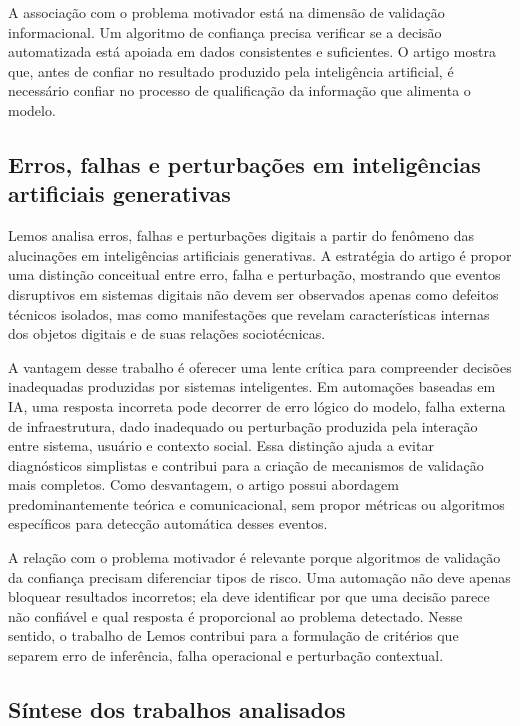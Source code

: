 \documentclass[12pt]{article}
\begin{document}
A associação com o problema motivador está na dimensão de validação informacional. Um algoritmo de confiança precisa verificar se a decisão automatizada está apoiada em dados consistentes e suficientes. O artigo mostra que, antes de confiar no resultado produzido pela inteligência artificial, é necessário confiar no processo de qualificação da informação que alimenta o modelo.

\subsection{Erros, falhas e perturbações em inteligências artificiais generativas}

Lemos \cite{lemos2024} analisa erros, falhas e perturbações digitais a partir do fenômeno das alucinações em inteligências artificiais generativas. A estratégia do artigo é propor uma distinção conceitual entre erro, falha e perturbação, mostrando que eventos disruptivos em sistemas digitais não devem ser observados apenas como defeitos técnicos isolados, mas como manifestações que revelam características internas dos objetos digitais e de suas relações sociotécnicas.

A vantagem desse trabalho é oferecer uma lente crítica para compreender decisões inadequadas produzidas por sistemas inteligentes. Em automações baseadas em IA, uma resposta incorreta pode decorrer de erro lógico do modelo, falha externa de infraestrutura, dado inadequado ou perturbação produzida pela interação entre sistema, usuário e contexto social. Essa distinção ajuda a evitar diagnósticos simplistas e contribui para a criação de mecanismos de validação mais completos. Como desvantagem, o artigo possui abordagem predominantemente teórica e comunicacional, sem propor métricas ou algoritmos específicos para detecção automática desses eventos.

A relação com o problema motivador é relevante porque algoritmos de validação da confiança precisam diferenciar tipos de risco. Uma automação não deve apenas bloquear resultados incorretos; ela deve identificar por que uma decisão parece não confiável e qual resposta é proporcional ao problema detectado. Nesse sentido, o trabalho de Lemos contribui para a formulação de critérios que separem erro de inferência, falha operacional e perturbação contextual.

\subsection{Síntese dos trabalhos analisados}
\end{document}
